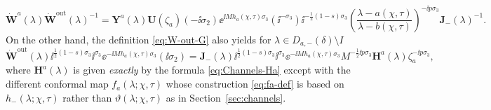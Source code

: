 \begin{equation}
\dot{\mathbf{W}}^a(\lambda)\dot{\mathbf{W}}^\mathrm{out}(\lambda)^{-1} 
=\mathbf{Y}^{a}(\lambda) \mathbf{U}(\zeta_a)(-\ii\sigma_2) \ee^{\ii M {h}_a(\chi,\tau)\sigma_3}(\ii^{-\sigma_3})\ii^{-\frac{1}{2}(1-s)\sigma_3} \left(\frac{\lambda-a(\chi,\tau)}{\lambda-b(\chi,\tau)}\right)^{-\ii p\sigma_3} \mathbf{J}_-(\lambda)^{-1}.
\label{eq:error-right-half-disk-What}
\end{equation}
On the other hand, the definition \eqref{eq:W-out-G} also yields for $\lambda\in D_{a,-}(\delta)\setminus I$
\begin{equation}
\dot{\mathbf{W}}^\mathrm{out}(\lambda)  \ii^{\frac{1}{2}(1-s)\sigma_3}  \ii^{\sigma_3}  \ee^{- \ii M {h}_a(\chi,\tau)\sigma_3}(\ii\sigma_2) = 
\mathbf{J}_{-}(\lambda)   \ii^{\frac{1}{2}(1-s)\sigma_3} \ii^{\sigma_3}  \ee^{- \ii M {h}_a(\chi,\tau)\sigma_3}
M^{-\frac{1}{2}\ii p \sigma_3}\mathbf{H}^a(\lambda) \zeta_a^{-\ii p \sigma_3},
\label{eq:W-hat-R-out}
\end{equation}
where $\mathbf{H}^{a}(\lambda)$ is given \emph{exactly} by the formula \eqref{eq:Channels-Ha} except with the different conformal map $f_a(\lambda;\chi,\tau)$ whose construction \eqref{eq:fa-def} is based on $h_{-}(\lambda;\chi,\tau)$ rather than $\vartheta(\lambda;\chi,\tau)$ as in Section~\ref{sec:channels}. 

